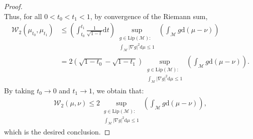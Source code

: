 \documentclass[10pt,a4paper]{article}
\newcommand\cM{\mathcal{M}}
\newcommand\cW{\mathcal{W}}
\newcommand\dd{\mathrm{d}}
\newcommand{\PAR}[1]{{{\left(#1\right)}}} %
\begin{document}
\begin{proof}
$$    $$
    Thus, for all $0<t_0<t_1<1$, by convergence of the Riemann sum,
    \begin{align*}
        \cW_2(\mu_{t_0},\mu_{t_1}) & \le  \PAR{ \int_{t_0}^{t_1} \frac{1}{\sqrt{1-t}}\dd t}  \sup_{\substack{g \in \text{Lip}(\cM): \\ \int_\cM | \nabla g|^2 \dd \mu \le 1}} \PAR{ \int_\cM g\dd (\mu-\nu)} \\
                                   & =    2\PAR{\sqrt{1-t_0}-\sqrt{1-t_1}}  \sup_{\substack{g \in \text{Lip}(\cM):                      \\ \int_\cM | \nabla g|^2 \dd \mu \le 1}} \PAR{ \int_\cM g\dd (\mu-\nu)}.
    \end{align*}
    By taking $t_0 \rightarrow 0$ and $t_1 \rightarrow 1$, we obtain that:
    \begin{align*}
        \cW_2(\mu,\nu) \le 2 \sup_{\substack{g \in \text{Lip}(\cM): \\ \int_\cM | \nabla g|^2 \dd \mu \le 1}} \PAR{ \int_\cM g\dd (\mu-\nu)},
    \end{align*}
    which is the desired conclusion.
\end{proof}
\end{document}
